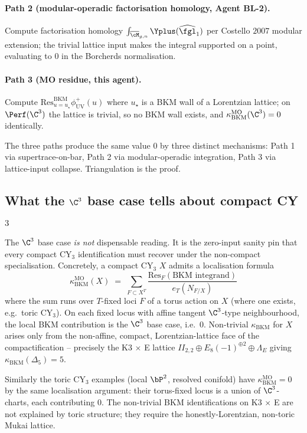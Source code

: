 \paragraph{Path 2 (modular-operadic factorisation homology,
Agent BL-2).} Compute factorisation homology
$\int_{\overline{\cM}_{g, n}} \Yplus(\widehat{\fgl}_1)$ per
Costello $2007$ modular extension; the trivial lattice input
makes the integral supported on a point, evaluating to
$0$ in the Borcherds normalisation.

\paragraph{Path 3 (MO residue, this agent).} Compute
$\mathrm{Res}_{u = u_\star}^{\mathrm{BKM}} \phi^+_{\mathrm{UV}}(u)$
where $u_\star$ is a BKM wall of a Lorentzian lattice; on
$\Perf(\C^3)$ the lattice is trivial, so no BKM wall exists, and
$\kappa_{\mathrm{BKM}}^{\mathrm{MO}}(\C^3) = 0$ identically.

The three paths produce the same value $0$ by three distinct
mechanisms: Path 1 via supertrace-on-bar, Path 2 via modular-operadic
integration, Path 3 via lattice-input collapse. Triangulation is
the proof.

\subsection*{What the $\C^3$ base case tells about compact CY$_3$}

The $\C^3$ base case \emph{is not} dispensable reading. It is the
zero-input sanity pin that every compact CY$_3$ identification must
recover under the non-compact specialisation. Concretely, a compact
CY$_3$ $X$ admits a localisation formula
\[
 \kappa_{\mathrm{BKM}}^{\mathrm{MO}}(X)
 \;=\; \sum_{F \subset X^T} \frac{\mathrm{Res}_F(\text{
 BKM integrand})}{e_T(N_{F / X})}
\]
where the sum runs over $T$-fixed loci $F$ of a torus action on $X$
(where one exists, e.g.\ toric CY$_3$). On each fixed locus with
affine tangent $\C^3$-type neighbourhood, the local BKM contribution
is the $\C^3$ base case, i.e.\ $0$. Non-trivial $\kappa_{\mathrm{BKM}}$
for $X$ arises only from the non-affine, compact, Lorentzian-lattice
face of the compactification -- precisely the K3 $\times$ E
lattice $II_{2, 2} \oplus E_8(-1)^{\oplus 2} \oplus \Lambda_E$
giving $\kappa_{\mathrm{BKM}}(\Delta_5) = 5$.

Similarly the toric CY$_3$ examples (local $\bP^2$, resolved
conifold) have $\kappa_{\mathrm{BKM}}^{\mathrm{MO}} = 0$ by the
same localisation argument: their torus-fixed locus is a union of
$\C^3$-charts, each contributing $0$. The non-trivial BKM
identifications on K3 $\times$ E are not explained by toric
structure; they require the honestly-Lorentzian, non-toric
Mukai lattice.


